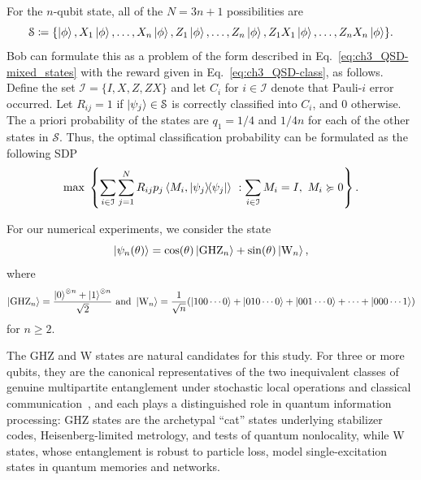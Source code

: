 For the $n$-qubit state, all of the $N = 3n+1$ possibilities are 
\begin{equation}
    \mathcal{S} \coloneqq \{ \ket{\phi}, X_1 \ket{\phi}, \ldots, X_n \ket{\phi}, Z_1 \ket{\phi}, \ldots, Z_n \ket{\phi}, Z_1 X_1 \ket{\phi}, \ldots, Z_n X_n \ket{\phi} \}.    
\end{equation}
Bob can formulate this as a problem of the form described in Eq.~\eqref{eq:ch3_QSD-mixed_states} with the reward given in Eq.~\eqref{eq:ch3_QSD-class}, as follows.
Define the set $\mathcal{I} = \{ I, X, Z, ZX \}$ and let $C_i$ for $i \in \mathcal{I}$ denote that Pauli-$i$ error occurred.
Let $R_{ij} = 1$ if $\ket{\psi_j} \in \mathcal{S}$ is correctly classified into $C_i$, and $0$ otherwise.
The a priori probability of the states are $q_1 = 1/4$ and $1/4n$ for each of the other states in $\mathcal{S}$.
Thus, the optimal classification probability can be formulated as the following SDP
\begin{equation}
    \max \; \left\{ \sum_{i \in \mathcal{I}} \sum_{j=1}^N R_{ij} p_j \left\langle M_i, \ketbra{\psi_j} \right\rangle\ : \sum_{i \in \mathcal{I}} M_i = I,\ M_i \succcurlyeq 0 \right\}.
\end{equation}

For our numerical experiments, we consider the state
\begin{equation}
    \label{eq:qetc}
    \ket{\psi_n(\theta)} = \cos(\theta) \ket{\mathrm{GHZ}_n} + \sin(\theta) \ket{\mathrm{W}_n},
\end{equation}
where
\begin{equation*}
    \ket{\mathrm{GHZ}_n} = \frac{\ket{0}^{\otimes n} + \ket{1}^{\otimes n}}{\sqrt{2}}\ \text{and}\ \ket{\mathrm{W}_n} = \frac{1}{\sqrt{n}}(\ket{100 \cdots 0} + \ket{010 \cdots 0} + \ket{001 \cdots 0} + \cdots + \ket{000 \cdots 1}) 
\end{equation*} 
for $n \geq 2$.

The GHZ and W states are natural candidates for this study. 
For three or more qubits, they are the canonical representatives of the two inequivalent classes of genuine multipartite entanglement under stochastic local operations and classical communication~\cite{dur2000three}, and each plays a distinguished role in quantum information processing: GHZ states are the
archetypal ``cat'' states underlying stabilizer codes, Heisenberg-limited metrology, and tests of quantum nonlocality, while W states, whose entanglement is robust to particle loss, model single-excitation states in quantum memories and networks.

